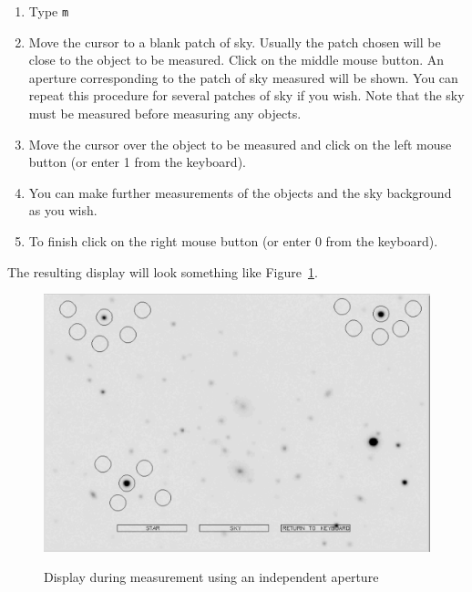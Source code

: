 \documentclass[twoside,11pt,nolof]{starlink}
\begin{document}
\begin{enumerate}
\begin{enumerate}
    \item Type \texttt{m}

    \item Move the cursor to a blank patch of sky.  Usually the patch
     chosen will be close to the object to be measured.  Click on the
     middle mouse button.  An aperture corresponding to the patch of
     sky measured will be shown.  You can repeat this procedure for
     several patches of sky if you wish.  Note that the sky must be
     measured before measuring any objects.

    \item Move the cursor over the object to be measured and click
     on the left mouse button (or enter 1 from the keyboard).

    \item You can make further measurements of the objects and the sky
     background as you wish.

    \item To finish click on the right mouse button (or enter 0 from
     the keyboard).

  \end{enumerate}

   The resulting display will look something like Figure~\ref{an2}.

  \begin{figure}[htbp]
     \centering
     \includegraphics[totalheight=3in]{sc6_ap2}
     \begin{quote}
     \caption{Display during measurement using an independent aperture
     \label{an2} }
     \end{quote}
  \end{figure}


\end{enumerate}
\end{document}
